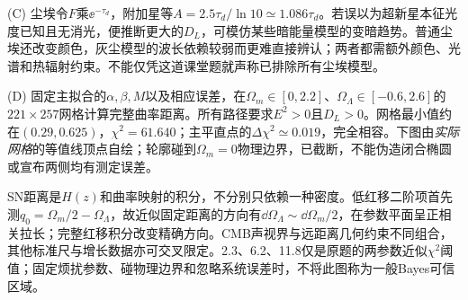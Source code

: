 \begin{solution}
(C) 尘埃令$F$乘$\ee^{-\tau_d}$，附加星等$A=2.5\tau_d/\ln10\simeq1.086\tau_d$。若误以为超新星本征光度已知且无消光，便推断更大的$D_L$，可模仿某些暗能量模型的变暗趋势。普通尘埃还改变颜色，灰尘模型的波长依赖较弱而更难直接辨认；两者都需额外颜色、光谱和热辐射约束。不能仅凭这道课堂题就声称已排除所有尘埃模型。

(D) 固定主拟合的$\alpha,\beta,M$以及相应误差，在$\Omega_m\in[0,2.2]$、$\Omega_\Lambda\in[-0.6,2.6]$的$221\times257$网格计算完整曲率距离。所有路径要求$E^2>0$且$D_L>0$。网格最小值约在$(0.29,0.625)$，$\chi^2=61.640$；主平直点的$\Delta\chi^2\simeq0.019$，完全相容。下图由\emph{实际网格}的等值线顶点自绘；轮廓碰到$\Omega_m=0$物理边界，已截断，不能伪造闭合椭圆或宣布两侧均有测定误差。

\begin{center}\end{center}
SN距离是$H(z)$和曲率映射的积分，不分别只依赖一种密度。低红移二阶项首先测$q_0=\Omega_m/2-\Omega_\Lambda$，故近似固定距离的方向有$\dd\Omega_\Lambda\sim\dd\Omega_m/2$，在参数平面呈正相关拉长；完整红移积分改变精确方向。CMB声视界与远距离几何约束不同组合，其他标准尺与增长数据亦可交叉限定。2.3、6.2、11.8仅是原题的两参数近似$\chi^2$阈值；固定烦扰参数、碰物理边界和忽略系统误差时，不将此图称为一般Bayes可信区域。
\end{solution}
